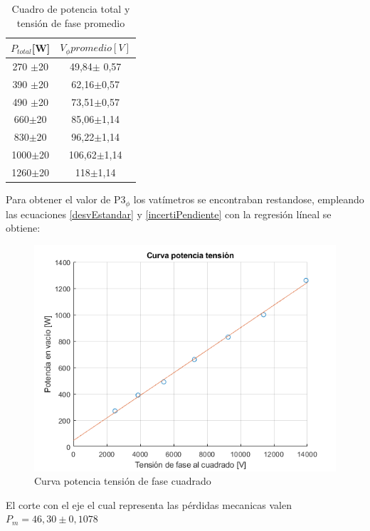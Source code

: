 \documentclass[11pt,letterpaper]{article}     %
\begin{document}
\begin{table}[H]
	\centering
	\caption{Cuadro de potencia total y tensión de fase promedio}
	\label{cuado: p3f y Vf}
	\begin{tabular}{|c|c|}
		\hline
		$P_{total}$[W]&$V_{\phi}promedio [V]$ \\ \hline
		270 $\pm$20&49,84$\pm$ 0,57\\ \hline
		390 $\pm$20&62,16$\pm$0,57 \\ \hline
		490 $\pm$20&73,51$\pm$0,57 \\ \hline
		660$\pm$20&85,06$\pm$1,14 \\ \hline
		830$\pm$20&96,22$\pm$1,14 \\ \hline
		1000$\pm$20&106,62$\pm$1,14 \\ \hline
		1260$\pm$20 & 118$\pm$1,14 \\ \hline		
	\end{tabular}
\end{table}

Para obtener el valor de P3$_\phi$ los vatímetros se encontraban restandose, empleando las ecuaciones \ref{desvEstandar} y \ref{incertiPendiente} con la regresión líneal se obtiene:

\begin{figure}[H]
	\centering
	\includegraphics[scale=0.8]{./recursos-Lab8/curvaPruebaVacioPotenciaVsTensionCuadrado.png}
	\caption{Curva potencia tensión de fase cuadrado}
	\label{fig:curvaPotenciaTensionCuadrado}
\end{figure}

El corte con el eje el cual representa las pérdidas mecanicas valen $P_m=46,30\pm 0,1078$
\end{document}
